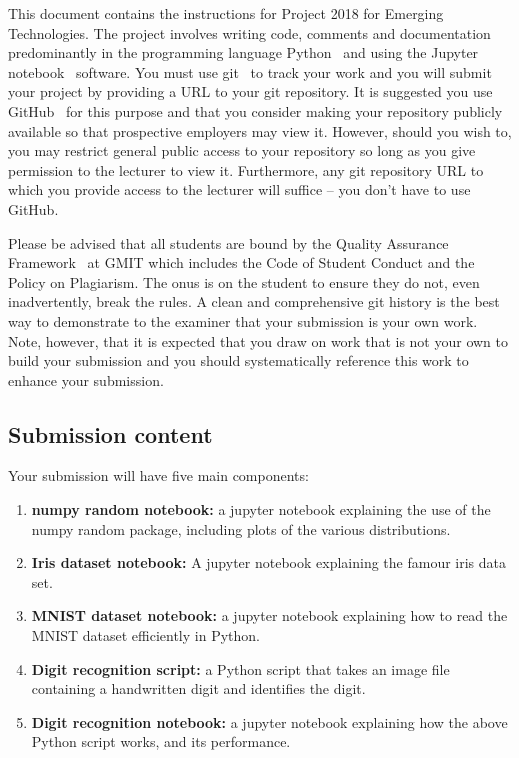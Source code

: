 \documentclass[12pt, a4paper]{article}
\title{\projectname}
\author{\modulename}
\date{Due: \duedate}
\newcommand{\modulename}{Emerging Technologies}
\newcommand{\projectyear}{2018}
\newcommand{\projectname}{Project \projectyear}
\begin{document}
\maketitle

\noindent
This document contains the instructions for \projectname{} for \modulename{}.
The project involves writing code, comments and documentation predominantly in the programming language Python~\cite{python} and using the Jupyter notebook~\cite{jupyter} software.
You must use git~\cite{git} to track your work and you will submit your project by providing a URL to your git repository.
It is suggested you use GitHub~\cite{github} for this purpose and that you consider making your repository publicly available so that prospective employers may view it.
However, should you wish to, you may restrict general public access to your repository so long as you give permission to the lecturer to view it.
Furthermore, any git repository URL to which you provide access to the lecturer will suffice -- you don't have to use GitHub.

Please be advised that all students are bound by the Quality Assurance Framework~\cite{gmitqaf} at GMIT which includes the Code of Student Conduct and the Policy on Plagiarism.
The onus is on the student to ensure they do not, even inadvertently, break the rules.
A clean and comprehensive git history is the best way to demonstrate to the examiner that your submission is your own work.
Note, however, that it is expected that you draw on work that is not your own to build your submission and you should systematically reference this work to enhance your submission.

\subsection*{Submission content}
Your submission will have five main components:

\begin{enumerate}
  \item \textbf{numpy random notebook:} a jupyter notebook explaining the use of the numpy random package, including plots of the various distributions.
  \item \textbf{Iris dataset notebook:} A jupyter notebook explaining the famour iris data set.
  \item \textbf{MNIST dataset notebook:} a jupyter notebook explaining how to read the MNIST dataset efficiently in Python.
  \item \textbf{Digit recognition script:} a Python script that takes an image file containing a handwritten digit and identifies the digit.
  \item \textbf{Digit recognition notebook:} a jupyter notebook explaining how the above Python script works, and its performance.
\end{enumerate}
\end{document}
